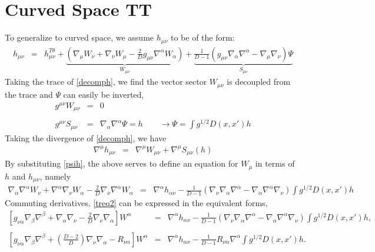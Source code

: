 \documentclass[10pt,letterpaper]{article}
\numberwithin{equation}{section}
\begin{document}
\section{Curved Space TT}
%
%
To generalize to curved space, we assume $h_{\mu\nu}$ to be of the form:
\begin{eqnarray}
h_{\mu\nu} &=& h_{\mu\nu}^{T\theta} + \underbrace{\left(\nabla_\mu W_\nu + \nabla_\nu W_\mu - \frac{2}{D}g_{\mu\nu}\nabla^\alpha W_\alpha\right)}_{W_{\mu\nu}} + \underbrace{\frac{1}{D-1}\left( g_{\mu\nu}\nabla_\alpha \nabla^\alpha - \nabla_\mu\nabla_\nu\right)\Psi}_{S_{\mu\nu}}
\label{decomph}
\end{eqnarray}
Taking the trace of \eqref{decomph}, we find the vector sector $W_{\mu\nu}$ is decoupled from the trace and $\Psi$ can easily be inverted,
\begin{eqnarray}
g^{\mu\nu}W_{\mu\nu} &=& 0
\\ \nonumber\\
g^{\mu\nu}S_{\mu\nu} &=& \nabla_\alpha\nabla^\alpha \Psi = h
\qquad
\to \Psi = \int g^{1/2} D(x,x') h
\label{psih}
\end{eqnarray}
Taking the divergence of \eqref{decomph}, we have
\begin{eqnarray}
\nabla^\mu h_{\mu\nu} &=& \nabla^\mu W_{\mu\nu} + \nabla^\mu S_{\mu\nu}(h)
\label{treq1}
\end{eqnarray}
By substituting \eqref{psih}, the above serves to define an equation for $W_{\mu}$ in terms of $h$ and $h_{\mu\nu}$, namely
\begin{eqnarray}
\nabla_\alpha \nabla^\alpha W_\nu +\nabla^\alpha \nabla_\nu W_\alpha - \frac{2}{D}\nabla_\nu\nabla^\alpha W_\alpha &=&
\nabla^\alpha h_{\alpha\nu} - \frac{1}{D-1}\left(\nabla_\nu \nabla_\alpha\nabla^\alpha - \nabla_\alpha\nabla^\alpha \nabla_\nu\right)
\int g^{1/2} D(x,x') h
\label{treq2}
\end{eqnarray}
Commuting derivatives, \eqref{treq2} can be expressed in the equivalent forms,
\begin{eqnarray}
\left[g_{\nu\alpha} \nabla_\beta \nabla^\beta +\nabla_\alpha \nabla_\nu - \frac{2}{D}\nabla_\nu\nabla_\alpha\right] W^\alpha &=&
\nabla^\alpha h_{\alpha\nu} - \frac{1}{D-1}\left(\nabla_\nu \nabla_\alpha\nabla^\alpha - \nabla_\alpha\nabla^\alpha \nabla_\nu\right)
\int g^{1/2} D(x,x') h,
\label{treq3}
\\ \nonumber\\
\left[g_{\nu\alpha}\nabla_\beta\nabla^\beta + \left(\frac{D-2}{D}\right)\nabla_\nu \nabla_\alpha - R_{\nu\alpha}\right]W^\alpha
&=& \nabla^\alpha h_{\alpha\nu} - \frac{1}{D-1}R_{\nu\alpha}\nabla^\alpha \int g^{1/2} D(x,x') h.
\label{treq4}
\end{eqnarray}
\end{document}
